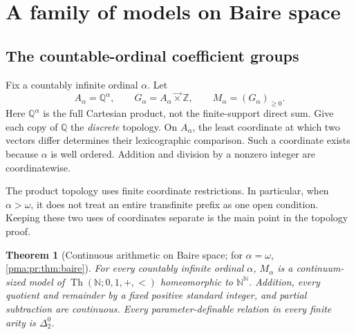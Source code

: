 \documentclass[11pt]{article}
\numberwithin{equation}{section}
\newtheorem{theorem}{Theorem}[section]
\theoremstyle{definition}
\theoremstyle{remark}
\newcommand{\N}{\mathbb N}
\newcommand{\Z}{\mathbb Z}
\newcommand{\Q}{\mathbb Q}
\newcommand{\Baire}{\N^{\N}}
\newcommand{\lex}{\mathbin{\overrightarrow\times}}
\newcommand{\Th}{\operatorname{Th}}
\begin{document}
\section{A family of models on Baire space}
\label{pma:cp:sec:baire}

\subsection{The countable-ordinal coefficient groups}

Fix a countably infinite ordinal $\alpha$. Let
\begin{equation}
\label{pma:cp:eq:alphamodel}
A_\alpha=\Q^\alpha,\qquad
G_\alpha=A_\alpha\lex\Z,\qquad
M_\alpha=(G_\alpha)_{\geq0}.
\end{equation}
Here $\Q^\alpha$ is the full Cartesian product, not the finite-support
direct sum. Give each copy of $\Q$ the \emph{discrete} topology.
On $A_\alpha$, the least coordinate at which two vectors differ determines
their lexicographic comparison. Such a coordinate exists because $\alpha$
is well ordered. Addition and division by a nonzero integer are
coordinatewise.

The product topology uses finite coordinate restrictions. In particular,
when $\alpha>\omega$, it does not treat an entire transfinite prefix as
one open condition. Keeping these two uses of coordinates separate is the
main point in the topology proof.

\begin{theorem}[Continuous arithmetic on Baire space; for $\alpha=\omega$, \cref{pma:pr:thm:baire}]
\label{pma:cp:thm:baire}
For every countably infinite ordinal $\alpha$, $M_\alpha$ is a
continuum-sized model of $\Th(\N;0,1,+,<)$ homeomorphic to $\Baire$. Addition,
every quotient and remainder by a fixed positive standard integer, and
partial subtraction are continuous. Every parameter-definable relation in
every finite arity is $\Delta^0_2$.
\end{theorem}
\end{document}
